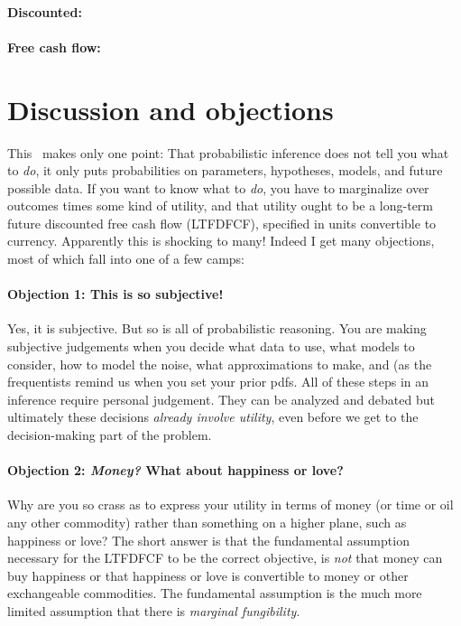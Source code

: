 \documentclass[12pt,twoside,pdftex]{article}
\begin{document}
\paragraph{Discounted:}

\paragraph{Free cash flow:}

\section{Discussion and objections}

This \documentname\ makes only one point: That probabilistic inference
does not tell you what to \emph{do}, it only puts probabilities on
parameters, hypotheses, models, and future possible data.  If you want
to know what to \emph{do}, you have to marginalize over outcomes times
some kind of utility, and that utility ought to be a long-term future
discounted free cash flow (LTFDFCF), specified in units convertible to
currency.  Apparently this is shocking to many!  Indeed I get many
objections, most of which fall into one of a few camps:

\paragraph{Objection 1: This is so subjective!}
Yes, it is subjective.  But so is all of probabilistic reasoning.  You
are making subjective judgements when you decide what data to use,
what models to consider, how to model the noise, what approximations
to make, and (as the frequentists remind us when you set your prior pdfs.  All of these steps in an
inference require personal judgement.  They can be analyzed and
debated but ultimately these decisions \emph{already involve utility},
even before we get to the decision-making part of the problem.

\paragraph{Objection 2: \emph{Money?} What about happiness or love?}
Why are you so crass as to express your utility in terms of money (or
time or oil any other commodity) rather than something on a higher
plane, such as happiness or love?  The short answer is that the
fundamental assumption necessary for the LTFDFCF to be the correct
objective, is \emph{not} that money can buy happiness or that
happiness or love is convertible to money or other exchangeable
commodities.  The fundamental assumption is the much more limited
assumption that there is \emph{marginal fungibility}.
\end{document}
